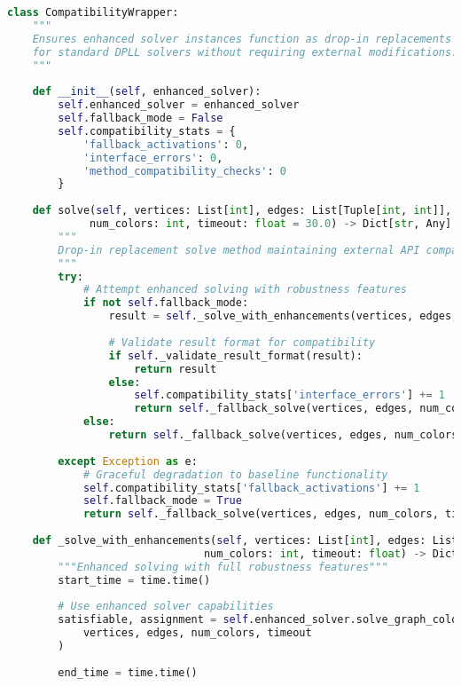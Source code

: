 \begin{lstlisting}[language=Python, caption=Interface Compatibility for Drop-in Replacement Operation]
class CompatibilityWrapper:
    """
    Ensures enhanced solver instances function as drop-in replacements 
    for standard DPLL solvers without requiring external modifications.
    """
    
    def __init__(self, enhanced_solver):
        self.enhanced_solver = enhanced_solver
        self.fallback_mode = False
        self.compatibility_stats = {
            'fallback_activations': 0,
            'interface_errors': 0,
            'method_compatibility_checks': 0
        }
    
    def solve(self, vertices: List[int], edges: List[Tuple[int, int]], 
             num_colors: int, timeout: float = 30.0) -> Dict[str, Any]:
        """
        Drop-in replacement solve method maintaining external API compatibility.
        """
        try:
            # Attempt enhanced solving with robustness features
            if not self.fallback_mode:
                result = self._solve_with_enhancements(vertices, edges, num_colors, timeout)
                
                # Validate result format for compatibility
                if self._validate_result_format(result):
                    return result
                else:
                    self.compatibility_stats['interface_errors'] += 1
                    return self._fallback_solve(vertices, edges, num_colors, timeout)
            else:
                return self._fallback_solve(vertices, edges, num_colors, timeout)
                
        except Exception as e:
            # Graceful degradation to baseline functionality
            self.compatibility_stats['fallback_activations'] += 1
            self.fallback_mode = True
            return self._fallback_solve(vertices, edges, num_colors, timeout)
    
    def _solve_with_enhancements(self, vertices: List[int], edges: List[Tuple[int, int]], 
                               num_colors: int, timeout: float) -> Dict[str, Any]:
        """Enhanced solving with full robustness features"""
        start_time = time.time()
        
        # Use enhanced solver capabilities
        satisfiable, assignment = self.enhanced_solver.solve_graph_coloring_with_robustness(
            vertices, edges, num_colors, timeout
        )
        
        end_time = time.time()
        

\end{lstlisting}
